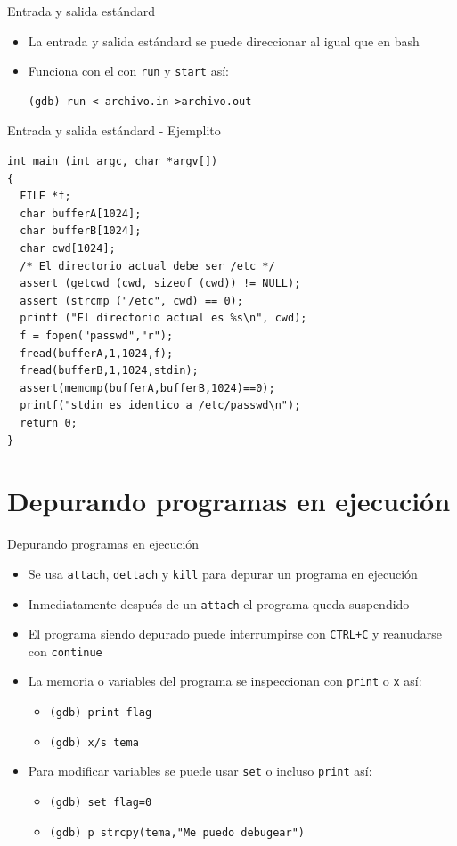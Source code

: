\documentclass[xetex]{beamer}
\begin{document}
\begin{frame}[fragile]{Entrada y salida estándard }
\begin{itemize}
\item La entrada y salida estándard se puede direccionar al igual que en bash
\item Funciona con el con \verb=run= y \verb=start= así:
\begin{verbatim}
(gdb) run < archivo.in >archivo.out
\end{verbatim}
\end{itemize}

\end{frame}

\begin{frame}[fragile]{Entrada y salida estándard - Ejemplito}
\begin{lstlisting}
int main (int argc, char *argv[]) 
{
  FILE *f;
  char bufferA[1024];
  char bufferB[1024];  
  char cwd[1024];
  /* El directorio actual debe ser /etc */
  assert (getcwd (cwd, sizeof (cwd)) != NULL);
  assert (strcmp ("/etc", cwd) == 0);
  printf ("El directorio actual es %s\n", cwd);
  f = fopen("passwd","r");
  fread(bufferA,1,1024,f);
  fread(bufferB,1,1024,stdin);
  assert(memcmp(bufferA,bufferB,1024)==0);
  printf("stdin es identico a /etc/passwd\n");  
  return 0;
}
\end{lstlisting}
\end{frame}

\section{Depurando programas en ejecución}

\begin{frame}[fragile]{Depurando programas en ejecución}
\begin{itemize}
\item Se usa \verb=attach=, \verb=dettach= y \verb=kill= para depurar un programa en ejecución
\item Inmediatamente después de un \verb=attach= el programa queda suspendido
\item El programa siendo depurado puede interrumpirse con \verb=CTRL+C= y reanudarse con \verb=continue=
\item La memoria o variables del programa se inspeccionan con \verb=print= o \verb=x= así:
\begin{itemize}
\item \verb=(gdb) print flag=
\item \verb=(gdb) x/s tema=
\end{itemize}
\item Para modificar variables se puede usar \verb=set= o incluso \verb=print= así:
\begin{itemize}
\item \verb#(gdb) set flag=0#
\item \verb#(gdb) p strcpy(tema,"Me puedo debugear")#
\end{itemize}
\end{itemize}
\end{frame}
\end{document}
